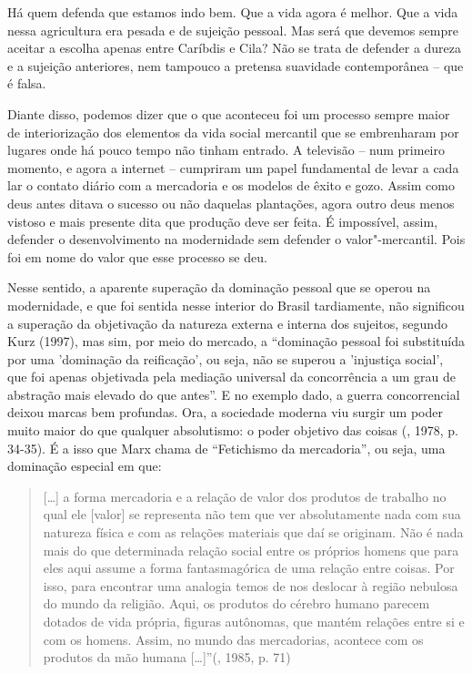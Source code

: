 Há quem defenda que estamos indo bem. Que a vida agora é melhor. Que a
vida nessa agricultura era pesada e de sujeição pessoal. Mas será que
devemos sempre aceitar a escolha apenas entre Caríbdis e Cila? Não se
trata de defender a dureza e a sujeição anteriores, nem tampouco a
pretensa suavidade contemporânea -- que é falsa.

Diante disso, podemos dizer que o que aconteceu foi um processo sempre
maior de interiorização dos elementos da vida social mercantil que se
embrenharam por lugares onde há pouco tempo não tinham entrado. A
televisão -- num primeiro momento, e agora a internet -- cumpriram um
papel fundamental de levar a cada lar o contato diário com a mercadoria
e os modelos de êxito e gozo. Assim como deus antes ditava o sucesso ou
não daquelas plantações, agora outro deus menos vistoso e mais presente
dita que produção deve ser feita. É impossível, assim, defender o
desenvolvimento na modernidade sem defender o valor"-mercantil. Pois foi
em nome do valor que esse processo se deu.

Nesse sentido, a aparente superação da dominação pessoal que se operou
na modernidade, e que foi sentida nesse interior do Brasil tardiamente,
não significou a superação da objetivação da natureza externa e interna
dos sujeitos, segundo Kurz (1997), mas sim, por meio do mercado, a
``dominação pessoal foi substituída por uma 'dominação da reificação',
ou seja, não se superou a 'injustiça social', que foi apenas objetivada
pela mediação universal da concorrência a um grau de abstração mais
elevado do que antes''. E no exemplo dado, a guerra concorrencial deixou
marcas bem profundas. Ora, a sociedade moderna viu surgir um poder muito
maior do que qualquer absolutismo: o poder objetivo das coisas (,
1978, p. 34-35). É a isso que Marx chama de ``Fetichismo da
mercadoria'', ou seja, uma dominação especial em que:

\begin{quote}
[\ldots{}] a forma mercadoria e a relação de valor dos produtos de
trabalho no qual ele [valor] se representa não tem que ver
absolutamente nada com sua natureza física e com as relações materiais
que daí se originam. Não é nada mais do que determinada relação social
entre os próprios homens que para eles aqui assume a forma
fantasmagórica de uma relação entre coisas. Por isso, para encontrar uma
analogia temos de nos deslocar à região nebulosa do mundo da religião.
Aqui, os produtos do cérebro humano parecem dotados de vida própria,
figuras autônomas, que mantém relações entre si e com os homens. Assim,
no mundo das mercadorias, acontece com os produtos da mão humana
[\ldots{}]''(, 1985, p. 71)
\end{quote}

